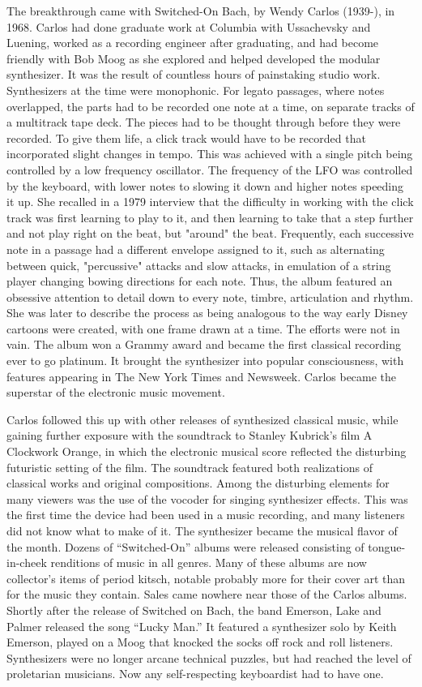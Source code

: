 The breakthrough came with Switched-On Bach, by Wendy Carlos (1939-), in 1968. Carlos had done graduate work at Columbia with Ussachevsky and Luening, worked as a recording engineer after graduating, and had become friendly with Bob Moog as she explored and helped developed the modular synthesizer. It was the result of countless hours of painstaking studio work. Synthesizers at the time were monophonic. For legato passages, where notes overlapped, the parts had to be recorded one note at a time, on separate tracks of a multitrack tape deck. The pieces had to be thought through before they were recorded. To give them life, a click track would have to be recorded that incorporated slight changes in tempo. This was achieved with a single pitch being controlled by a low frequency oscillator. The frequency of the LFO was controlled by the keyboard, with lower notes to slowing it down and higher notes speeding it up. She recalled in a 1979 interview that the difficulty in working with the click track was first learning to play to it, and then learning to take that a step further and not play right on the beat, but "around" the beat. Frequently, each successive note in a passage had a different envelope assigned to it, such as alternating between quick, "percussive" attacks and slow attacks, in emulation of a string player changing bowing directions for each note. Thus, the album featured an obsessive attention to detail down to every note, timbre, articulation and rhythm. She was later to describe the process as being analogous to the way early Disney cartoons were created, with one frame drawn at a time. The efforts were not in vain. The album won a Grammy award and became the first classical recording ever to go platinum. It brought the synthesizer into popular consciousness, with features appearing in The New York Times and Newsweek. Carlos became the superstar of the electronic music movement.


Carlos followed this up with other releases of synthesized classical music, while gaining further exposure with the soundtrack to Stanley Kubrick's film A Clockwork Orange, in which the electronic musical score reflected the disturbing futuristic setting of the film. The soundtrack featured both realizations of classical works and original compositions. Among the disturbing elements for many viewers was the use of the vocoder for singing synthesizer effects. This was the first time the device had been used in a music recording, and many listeners did not know what to make of it. The synthesizer became the musical flavor of the month. Dozens of ``Switched-On'' albums were released consisting of tongue-in-cheek renditions of music in all genres. Many of these albums are now collector's items of period kitsch, notable probably more for their cover art than for the music they contain. Sales came nowhere near those of the Carlos albums. Shortly after the release of Switched on Bach, the band Emerson, Lake and Palmer released the song ``Lucky Man.'' It featured a synthesizer solo by Keith Emerson, played on a Moog that knocked the socks off rock and roll listeners. Synthesizers were no longer arcane technical puzzles, but had reached the level of proletarian musicians. Now any self-respecting keyboardist had to have one.

